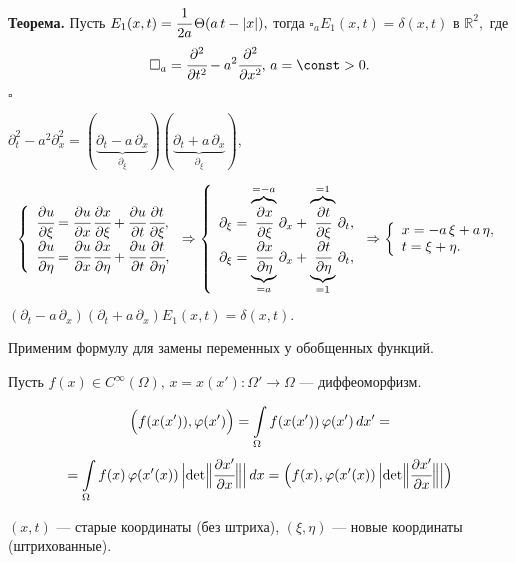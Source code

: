 \documentclass[12pt,a4paper,draft]{article}
\DeclareRobustCommand*{\т}{~--- }
\DeclareRobustCommand*{\ч}{~-- }
\begin{document}
\textbf{Теорема.} Пусть $E_1(x,t)=\cfrac1{2a}\,\Theta(a\,t-|x|),$
тогда $\square_a E_1(x,t)=\delta(x,t)$ в $\mathbb R^2,$ где
$$\square_a=\cfrac{\partial^2}{\partial
t^2}-a^2\cfrac{\partial^2}{\partial x^2},\,a=\const  >0.$$

$\square$

$\partial_t^2-a^2\partial_x^2=(\underbrace{\partial_t-a\,\partial_x}_{\partial_{\xi}})
(\underbrace{\partial_t+a\,\partial_x}_{\partial_{\xi}}),$

$$
\left\{%
\begin{array}{ll}
    \cfrac{\partial u}{\partial\xi}=\cfrac{\partial u}{\partial x}\,\cfrac{\partial x}{\partial\xi}+
    \cfrac{\partial u}{\partial t}\,\cfrac{\partial t}{\partial\xi},  \\
    \cfrac{\partial u}{\partial\eta}=\cfrac{\partial u}{\partial x}\,\cfrac{\partial x}{\partial\eta}+
    \cfrac{\partial u}{\partial t}\,\cfrac{\partial t}{\partial\eta}, \\
\end{array}%
\right.   \Rightarrow
\left\{%
\begin{array}{ll}
    \partial_\xi=\overbrace{\cfrac{\partial x}{\partial\xi}}^{=-a}\partial_x+
    \overbrace{\cfrac{\partial t}{\partial\xi}}^{=1}\partial_t,  \\
    \partial_\xi=\underbrace{\cfrac{\partial x}{\partial\eta}}_{=a}\partial_x+
    \underbrace{\cfrac{\partial t}{\partial\eta}}_{=1}\partial_t, \\
\end{array}%
\right. \Rightarrow
\left\{%
\begin{array}{ll}
    x=-a\,\xi +a\,\eta,  \\
    t=\xi + \eta. \\
\end{array}%
\right.
 $$

$(\partial_t-a\,\partial_x)(\partial_t+a\,\partial_x)E_1(x,t)=\delta(x,t).$

Применим формулу для замены переменных у обобщенных функций.

Пусть $f(x)\in C^{\infty}(\Omega),\, x=x(x')\colon
\Omega'\to\Omega$ --- диффеоморфизм.

$$\Bigl(f(x(x')),\varphi(x')\Bigr)=\int\limits_{\Omega}f(x(x'))\,\varphi(x')\,dx'=$$
$$=\int\limits_{\Omega}f(x)\,\varphi(x'(x))\,\Bigl|\det\Bigl\|
\cfrac{\partial x'}{\partial x}\Bigr\|\Bigr|\,dx=
\Bigl(f(x),\varphi(x'(x))\,\Bigl|\det\Bigl\| \cfrac{\partial
x'}{\partial x}\Bigr\|\Bigr|\Bigr)$$

$(x,t)$ --- старые координаты (без штриха), $(\xi,\eta)$ --- новые
координаты (штрихованные).
\end{document}
